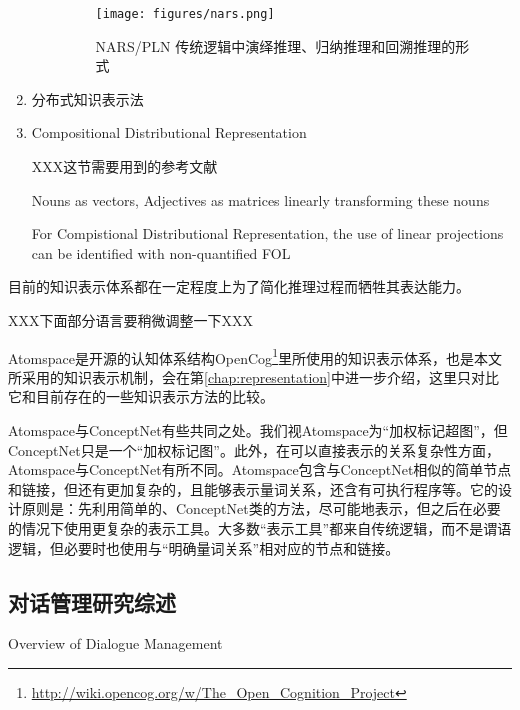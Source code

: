 \begin{enumerate}
\begin{enumerate}
\begin{figure}[htb]
\centering
\texttt{[image: figures/nars.png]}
\caption{ NARS/PLN 传统逻辑中演绎推理、归纳推理和回溯推理的形式 }
\label{fig:nars}
\end{figure}


\end{enumerate}

\item  {分布式知识表示法}



\item  {Compositional Distributional Representation}

XXX这节需要用到的参考文献

Nouns as vectors, Adjectives as matrices linearly transforming these nouns\cite{Baroni2010}

For Compistional Distributional Representation, the use of linear projections can be identified with non-quantified FOL\cite{Grefenstette2013}

\end{enumerate}






目前的知识表示体系都在一定程度上为了简化推理过程而牺牲其表达能力。


XXX下面部分语言要稍微调整一下XXX




Atomspace是开源的认知体系结构OpenCog\footnote{\url{http://wiki.opencog.org/w/The_Open_Cognition_Project}}里所使用的知识表示体系，也是本文所采用的知识表示机制，会在第\ref{chap:representation}中进一步介绍，这里只对比它和目前存在的一些知识表示方法的比较。

Atomspace与ConceptNet有些共同之处。我们视Atomspace为“加权标记超图”，但ConceptNet只是一个“加权标记图”。此外，在可以直接表示的关系复杂性方面，Atomspace与ConceptNet有所不同。Atomspace包含与ConceptNet相似的简单节点和链接，但还有更加复杂的，且能够表示量词关系，还含有可执行程序等。它的设计原则是：先利用简单的、ConceptNet类的方法，尽可能地表示，但之后在必要的情况下使用更复杂的表示工具。大多数“表示工具”都来自传统逻辑，而不是谓语逻辑，但必要时也使用与“明确量词关系”相对应的节点和链接。



\subsection{对话管理研究综述}{Overview of Dialogue Management}


